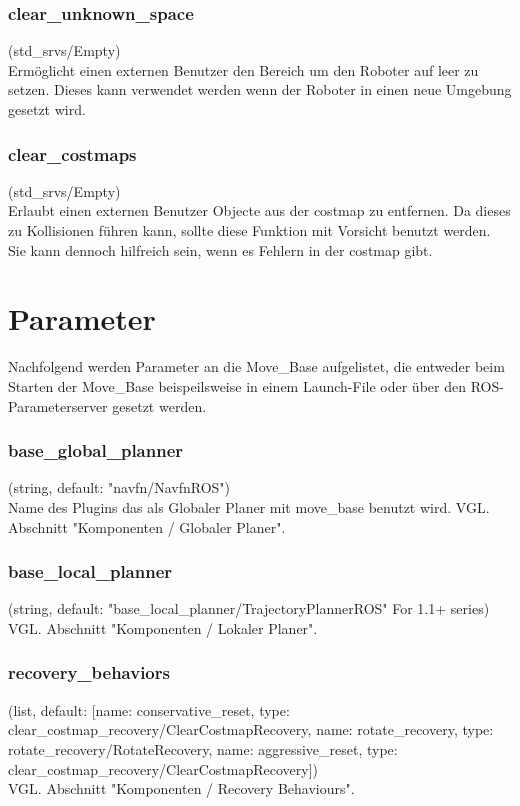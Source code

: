 \documentclass[oribibl]{llncs}
\begin{document}
\subsubsection{clear\_unknown\_space} (std\_srvs/Empty)\\
	Ermöglicht einen externen Benutzer den Bereich um den Roboter auf leer zu setzen. 	Dieses kann verwendet werden wenn der Roboter in einen neue Umgebung gesetzt 	wird.
\subsubsection{clear\_costmaps} (std\_srvs/Empty)\\
	Erlaubt einen externen Benutzer Objecte aus der costmap zu entfernen. Da dieses 	zu Kollisionen führen kann, sollte diese Funktion mit Vorsicht benutzt werden. Sie 	kann dennoch hilfreich sein, wenn es Fehlern in der costmap gibt.
	
\section{Parameter}
Nachfolgend werden Parameter an die Move\_Base aufgelistet, die entweder beim Starten der Move\_Base beispeilsweise in einem Launch-File oder über den ROS-Parameterserver gesetzt werden.
\subsubsection{base\_global\_planner} (string, default: "navfn/NavfnROS")\\
   Name des Plugins das als Globaler Planer mit move\_base benutzt wird. VGL. Abschnitt "Komponenten / Globaler Planer".

\subsubsection{base\_local\_planner} (string, default: "base\_local\_planner/TrajectoryPlannerROS" For 1.1+ series)\\
   VGL. Abschnitt "Komponenten / Lokaler Planer".
   
   
\subsubsection{recovery\_behaviors} (list, default: [{name: conservative\_reset, type: clear\_costmap\_recovery/ClearCostmapRecovery}, {name: rotate\_recovery, type: rotate\_recovery/RotateRecovery}, {name: aggressive\_reset, type: clear\_costmap\_recovery/ClearCostmapRecovery}])\\
   VGL. Abschnitt "Komponenten / Recovery Behaviours".
   
\end{document}
